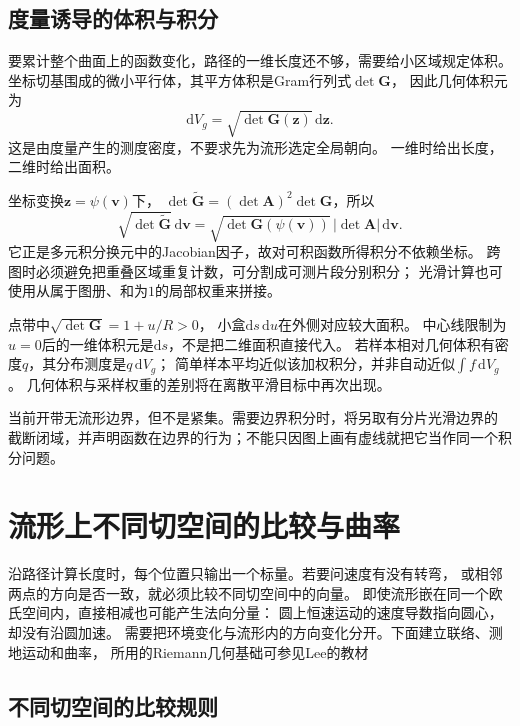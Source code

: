 \subsection{度量诱导的体积与积分}
\label{sec:geometry-riemannian-volume}

要累计整个曲面上的函数变化，路径的一维长度还不够，需要给小区域规定体积。
坐标切基围成的微小平行体，其平方体积是Gram行列式$\det\bm G$，
因此几何体积元为
\begin{equation}
 \mathrm dV_g=\sqrt{\det\bm G(\bm z)}\,\mathrm d\bm z.
 \label{eq:geometry-riemannian-volume}
\end{equation}
这是由度量产生的测度密度，不要求先为流形选定全局朝向。
一维时给出长度，二维时给出面积。

坐标变换$\bm z=\psi(\bm v)$下，
$\det\widetilde{\bm G}=(\det\bm A)^2\det\bm G$，所以
\[
 \sqrt{\det\widetilde{\bm G}}\,\mathrm d\bm v
 =\sqrt{\det\bm G(\psi(\bm v))}\,|\det\bm A|\,\mathrm d\bm v.
\]
它正是多元积分换元中的Jacobian因子，故对可积函数所得积分不依赖坐标。
跨图时必须避免把重叠区域重复计数，可分割成可测片段分别积分；
光滑计算也可使用从属于图册、和为$1$的局部权重来拼接。

点带中$\sqrt{\det\bm G}=1+u/R>0$，
小盒$\mathrm ds\,\mathrm du$在外侧对应较大面积。
中心线限制为$u=0$后的一维体积元是$\mathrm ds$，不是把二维面积直接代入。
若样本相对几何体积有密度$q$，其分布测度是$q\,\mathrm dV_g$；
简单样本平均近似该加权积分，并非自动近似$\int f\,\mathrm dV_g$。
几何体积与采样权重的差别将在离散平滑目标中再次出现。

当前开带无流形边界，但不是紧集。需要边界积分时，将另取有分片光滑边界的
截断闭域，并声明函数在边界的行为；不能只因图上画有虚线就把它当作同一个积分问题。

\section{流形上不同切空间的比较与曲率}
\label{sec:geometry-cross-point-comparison-curvature}

沿路径计算长度时，每个位置只输出一个标量。若要问速度有没有转弯，
或相邻两点的方向是否一致，就必须比较不同切空间中的向量。
即使流形嵌在同一个欧氏空间内，直接相减也可能产生法向分量：
圆上恒速运动的速度导数指向圆心，却没有沿圆加速。
需要把环境变化与流形内的方向变化分开。下面建立联络、测地运动和曲率，
所用的Riemann几何基础可参见Lee的教材

\subsection{不同切空间的比较规则}
\label{sec:geometry-connection-comparison}

